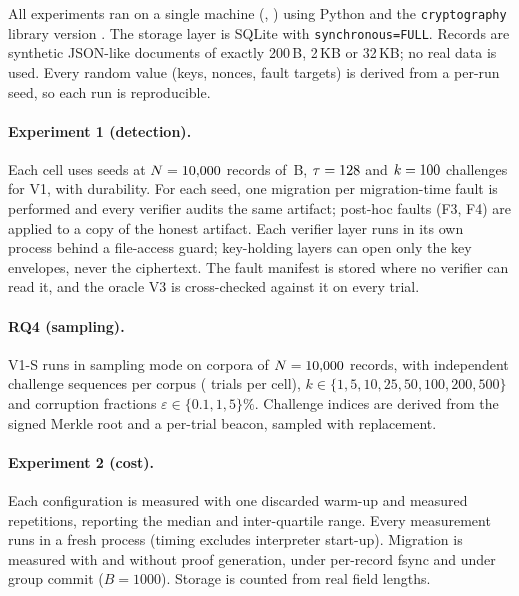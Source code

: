 
All experiments ran on a single machine (\akmcpu{}, \akmos{}) using Python \akmpython{} and the \texttt{cryptography} library version \akmcryptography{}. The storage layer is SQLite with \texttt{synchronous=FULL}. Records are synthetic JSON-like documents of exactly 200\,B, 2\,KB or 32\,KB; no real data is used. Every random value (keys, nonces, fault targets) is derived from a per-run seed, so each run is reproducible.

\paragraph{Experiment 1 (detection).} Each cell uses \akmEoneSeeds{} seeds at $N=10{,}000{}$ records of \akmEoneSize{}\,B, $\tau=128{}$ and $k=100{}$ challenges for V1, with \akmEoneFsync{} durability. For each seed, one migration per migration-time fault is performed and every verifier audits the same artifact; post-hoc faults (F3, F4) are applied to a copy of the honest artifact. Each verifier layer runs in its own process behind a file-access guard; key-holding layers can open only the key envelopes, never the ciphertext. The fault manifest is stored where no verifier can read it, and the oracle V3 is cross-checked against it on every trial.

\paragraph{RQ4 (sampling).} V1-S runs in sampling mode on \akmRqCorpora{} corpora of $N=10{,}000{}$ records, with \akmRqBeacons{} independent challenge sequences per corpus (\akmRqTrials{} trials per cell), $k\in\{1,5,10,25,50,100,200,500\}$ and corruption fractions $\varepsilon\in\{0.1,1,5\}\%$. Challenge indices are derived from the signed Merkle root and a per-trial beacon, sampled with replacement.

\paragraph{Experiment 2 (cost).} Each configuration is measured with one discarded warm-up and \akmEtwoReps{} measured repetitions, reporting the median and inter-quartile range. Every measurement runs in a fresh process (timing excludes interpreter start-up). Migration is measured with and without proof generation, under per-record fsync and under group commit ($B=1000$). Storage is counted from real field lengths.

